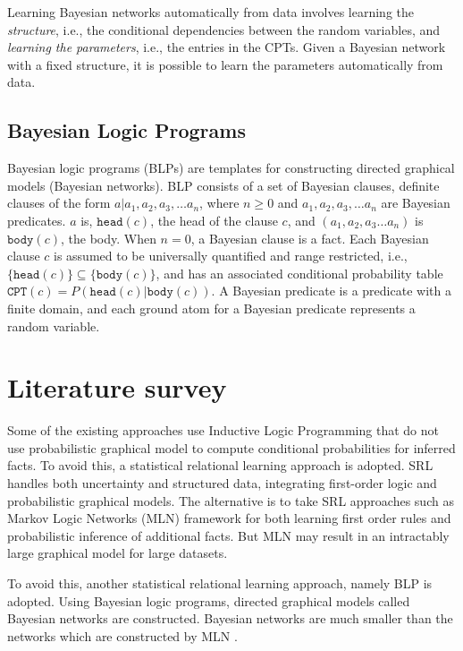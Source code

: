\documentclass[12pt,a4paper]{article}
\begin{document}
Learning Bayesian networks automatically from data involves learning
the \emph{structure}, i.e., the conditional dependencies between the
random variables, and \emph{learning the parameters}, i.e., the
entries in the CPTs. Given a Bayesian network with a fixed structure,
it is possible to learn the parameters automatically from data.

\subsection{Bayesian Logic Programs}
Bayesian logic programs (BLPs) are templates for constructing directed
graphical models (Bayesian networks). BLP consists of a set of
Bayesian clauses, definite clauses of the form $a | a_1, a_2, a_3,
\ldots a_n$, where $n \geq 0$ and $a_1, a_2, a_3, \ldots a_n$ are
Bayesian predicates. $a$ is, $\mathtt{head}(c)$, the head of the
clause $c$, and $(a_1, a_2, a_3 \ldots a_n)$ is $\mathtt{body}(c)$,
the body. When $n = 0$, a Bayesian clause is a fact. Each Bayesian
clause $c$ is assumed to be universally quantified and range
restricted, i.e., $\{\mathtt{head}(c)\} \subseteq
\{\mathtt{body}(c)\}$, and has an associated conditional probability
table $\mathtt{CPT}(c) = P(\mathtt{head}(c)|\mathtt{body}(c))$. A
Bayesian predicate is a predicate with a finite domain, and each
ground atom for a Bayesian predicate represents a random variable.

\section{Literature survey}
Some of the existing approaches use Inductive Logic Programming that
do not use probabilistic graphical model to compute conditional
probabilities for inferred facts. To avoid this, a statistical
relational learning approach is adopted. SRL handles both uncertainty
and structured data, integrating first-order logic and probabilistic
graphical models. The alternative is to take SRL approaches such as
Markov Logic Networks (MLN) framework for both learning first order
rules and probabilistic inference of additional facts. But MLN may
result in an intractably large graphical model for large datasets.

To avoid this, another statistical relational learning approach,
namely BLP is adopted. Using Bayesian logic programs, directed
graphical models called Bayesian networks are constructed. Bayesian
networks are much smaller than the networks which are constructed by
MLN \cite{sindhu2012, sindhu2013}.
\end{document}
